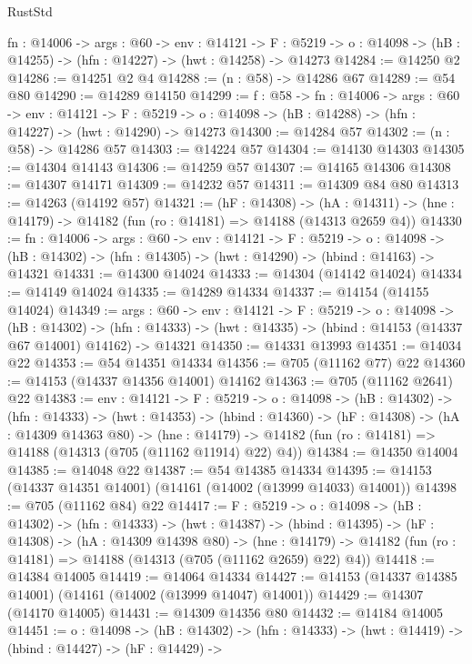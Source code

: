 \begin{lexlean}{RustStd}
\begin{coremodule}
  {fn : @14006} ->
  {args : @60} ->
  {env : @14121} ->
  {F : @5219} -> {o : @14098} -> (hB : @14255) -> (hfn : @14227) -> (hwt : @14258) -> @14273
@14284 := @14250 @2
@14286 := @14251 @2 @4
@14288 := (n : @58) -> @14286 @67
@14289 := @54 @80
@14290 := @14289 @14150
@14299 := {f : @58} ->
  {fn : @14006} ->
  {args : @60} ->
  {env : @14121} ->
  {F : @5219} -> {o : @14098} -> (hB : @14288) -> (hfn : @14227) -> (hwt : @14290) -> @14273
@14300 := @14284 @57
@14302 := (n : @58) -> @14286 @57
@14303 := @14224 @57
@14304 := @14130 @14303
@14305 := @14304 @14143
@14306 := @14259 @57
@14307 := @14165 @14306
@14308 := @14307 @14171
@14309 := @14232 @57
@14311 := @14309 @84 @80
@14313 := @14263 (@14192 @57)
@14321 := (hF : @14308) ->
  (hA : @14311) -> (hne : @14179) -> @14182 (fun (ro : @14181) => @14188 (@14313 @2659 @4))
@14330 := {fn : @14006} ->
  {args : @60} ->
  {env : @14121} ->
  {F : @5219} ->
  {o : @14098} -> (hB : @14302) -> (hfn : @14305) -> (hwt : @14290) -> (hbind : @14163) -> @14321
@14331 := @14300 @14024
@14333 := @14304 (@14142 @14024)
@14334 := @14149 @14024
@14335 := @14289 @14334
@14337 := @14154 (@14155 @14024)
@14349 := {args : @60} ->
  {env : @14121} ->
  {F : @5219} ->
  {o : @14098} ->
  (hB : @14302) ->
  (hfn : @14333) -> (hwt : @14335) -> (hbind : @14153 (@14337 @67 @14001) @14162) -> @14321
@14350 := @14331 @13993
@14351 := @14034 @22
@14353 := @54 @14351 @14334
@14356 := @705 (@11162 @77) @22
@14360 := @14153 (@14337 @14356 @14001) @14162
@14363 := @705 (@11162 @2641) @22
@14383 := {env : @14121} ->
  {F : @5219} ->
  {o : @14098} ->
  (hB : @14302) ->
  (hfn : @14333) ->
  (hwt : @14353) ->
  (hbind : @14360) ->
  (hF : @14308) ->
  (hA : @14309 @14363 @80) ->
  (hne : @14179) -> @14182 (fun (ro : @14181) => @14188 (@14313 (@705 (@11162 @11914) @22) @4))
@14384 := @14350 @14004
@14385 := @14048 @22
@14387 := @54 @14385 @14334
@14395 := @14153 (@14337 @14351 @14001) (@14161 (@14002 (@13999 @14033) @14001))
@14398 := @705 (@11162 @84) @22
@14417 := {F : @5219} ->
  {o : @14098} ->
  (hB : @14302) ->
  (hfn : @14333) ->
  (hwt : @14387) ->
  (hbind : @14395) ->
  (hF : @14308) ->
  (hA : @14309 @14398 @80) ->
  (hne : @14179) -> @14182 (fun (ro : @14181) => @14188 (@14313 (@705 (@11162 @2659) @22) @4))
@14418 := @14384 @14005
@14419 := @14064 @14334
@14427 := @14153 (@14337 @14385 @14001) (@14161 (@14002 (@13999 @14047) @14001))
@14429 := @14307 (@14170 @14005)
@14431 := @14309 @14356 @80
@14432 := @14184 @14005
@14451 := {o : @14098} ->
  (hB : @14302) ->
  (hfn : @14333) ->
  (hwt : @14419) ->
  (hbind : @14427) ->
  (hF : @14429) ->

\end{coremodule}
\end{lexlean}
